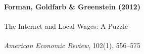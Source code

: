 \documentclass[12pt]{article}
\begin{document}
\begin{center}
{\Large\bfseries Forman, Goldfarb \& Greenstein (2012)}\\\\
{\large The Internet and Local Wages: A Puzzle}\\\\
\vspace{0.5em}
{\normalsize \textit{American Economic Review}, 102(1), 556--575}
\end{center}

\vspace{1em}




\end{document}

